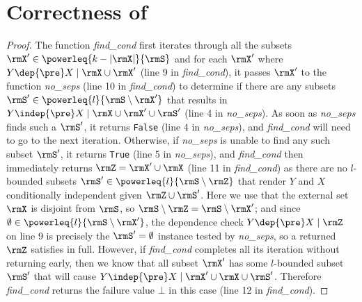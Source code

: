 \section{Correctness of {\method}}\label{apx:proofs-thm}
\citest*

\begin{proof}
  The function \textit{find\_cond} first iterates through all the
  subsets $\rmX'\in\powerleq{k-|\rmX|}{\rmS}$ and for each $\rmX'$ where
  $Y \dep{\pre} X \mid \rmX\cup\rmX'$ (line 9 in \textit{find\_cond}), it passes
  $\rmX'$ to the function \textit{no\_seps} (line 10 in
  \textit{find\_cond}) to determine if there are any subsets
  $\rmS'\in\powerleq{l}{\rmS\setminus\rmX'}$ that results in
  $Y \indep{\pre} X \mid \rmX\cup\rmX'\cup \rmS'$ (line 4 in \textit{no\_seps}).
  As soon as \textit{no\_seps} finds such a $\rmS'$, it returns
  \texttt{False} (line 4 in \textit{no\_seps}), and \textit{find\_cond}
  will need to go to the next iteration. Otherwise, if \textit{no\_seps}
  is unable to find any such subset $\rmS'$, it returns \texttt{True}
  (line 5 in \textit{no\_seps}), and \textit{find\_cond} then
  immediately returns $\rmZ=\rmX'\cup\rmX$ (line 11 in
  \textit{find\_cond}) as there are no $l$-bounded subsets
  $\rmS'\in\powerleq{l}{\rmS\setminus\rmZ}$ that render $Y$ and $X$
  conditionally independent given
  $\rmZ\cup\rmS'$. Here we use that the external set $\rmX$ is disjoint from
  $\rmS$, so $\rmS\setminus\rmZ=\rmS\setminus\rmX'$; and since
  $\emptyset\in\powerleq{l}{\rmS\setminus\rmX'}$, the dependence check
  $Y\dep{\pre}X\mid\rmZ$ on line 9 is precisely the $\rmS'=\emptyset$
  instance tested by \textit{no\_seps}, so a returned $\rmZ$ satisfies
   in full. However, if \textit{find\_cond} completes all its iteration
  without returning early, then we know that all subset $\rmX'$ has some
  $l$-bounded subset $\rmS'$ that will cause
  $Y\indep{\pre}X\mid\rmX'\cup\rmX\cup\rmS'$. Therefore
  \textit{find\_cond} returns the failure value $\bot$ in this case
  (line 12 in \textit{find\_cond}).
\end{proof}

